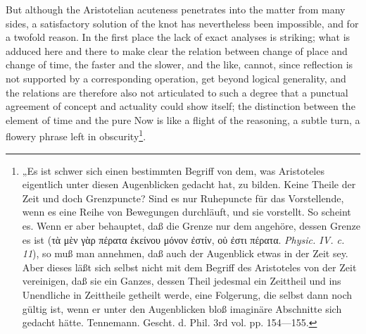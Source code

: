 \documentclass[12pt,a4paper,openany]{book}
\newcommand{\opage}[1]{\marginnote{\footnotesize\textit{[#1]}}}
\begin{document}
But although the Aristotelian acuteness penetrates into the matter from many sides, a satisfactory
\setcounter{footnote}{0}%
\opage{139}solution of the knot has nevertheless been impossible, and for a twofold reason. In the first place the lack of exact analyses is striking; what is adduced here and there to make clear the relation between change of place and change of time, the faster and the slower, and the like, cannot, since reflection is not supported by a corresponding operation, get beyond logical generality, and the relations are therefore also not articulated to such a degree that a punctual agreement of %
concept and actuality could show itself; the distinction between the element of time and the pure Now is like a flight of the reasoning, a subtle turn, a flowery phrase left in obscurity\footnote[1]{„Es ist schwer sich einen bestimmten Begriff von dem, was Aristoteles eigentlich unter diesen Augenblicken gedacht hat, zu bilden. Keine Theile der Zeit und doch Grenzpuncte? Sind es nur Ruhepuncte für das Vorstellende, wenn es eine Reihe von Bewegungen durchläuft, und sie vorstellt. So scheint es. Wenn er aber behauptet, daß die Grenze nur dem angehöre, dessen Grenze es ist (τὰ μὲν γὰρ πέρατα ἐκείνου μόνον ἐστίν, οὐ ἐστι πέρατα. \textit{Physic. IV. c. 11}), so muß man annehmen, daß auch der Augenblick etwas in der Zeit sey. Aber dieses läßt sich selbst nicht mit dem Begriff des Aristoteles von der Zeit vereinigen, daß sie ein Ganzes, dessen Theil jedesmal ein Zeittheil und ins Unendliche in Zeittheile getheilt werde, eine Folgerung, die selbst dann noch gültig ist, wenn er unter den Augenblicken bloß imaginäre Abschnitte sich gedacht hätte. Tennemann. Gescht. d. Phil. 3rd vol. pp. 154—155.}. %
\end{document}
